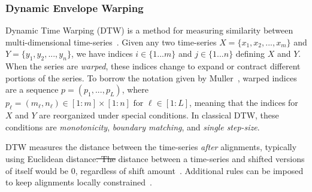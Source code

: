 \documentclass[lettersize,journal]{IEEEtran}
\makeatletter
\providecommand{\DIFadd}[1]{{\protect\color{blue}\uwave{#1}}} %
\providecommand{\DIFdel}[1]{{\protect\color{red}\sout{#1}}} %
\providecommand{\DIFaddbegin}{} %
\providecommand{\DIFaddend}{} %
\providecommand{\DIFdelbegin}{} %
\providecommand{\DIFdelend}{} %
\providecommand{\DIFscaledelfig}{0.5}
\newlength{\DIFdelgraphicswidth} %
\newlength{\DIFdelgraphicsheight} %
\providecommand{\DIFaddincludegraphics}[2][]{{\color{blue}\fbox{\DIFOincludegraphics[#1]{#2}}}} %
\providecommand{\DIFdelincludegraphics}[2][]{%
\sbox{\DIFdelgraphicsbox}{\DIFOincludegraphics[#1]{#2}}%
\settoboxwidth{\DIFdelgraphicswidth}{\DIFdelgraphicsbox} %
\settoboxtotalheight{\DIFdelgraphicsheight}{\DIFdelgraphicsbox} %
\scalebox{\DIFscaledelfig}{%
\parbox[b]{\DIFdelgraphicswidth}{\usebox{\DIFdelgraphicsbox}\\[-\baselineskip] \rule{\DIFdelgraphicswidth}{0em}}\llap{\resizebox{\DIFdelgraphicswidth}{\DIFdelgraphicsheight}{%
\setlength{\unitlength}{\DIFdelgraphicswidth}%
\begin{picture}(1,1)%
\thicklines\linethickness{2pt} %
{\color[rgb]{1,0,0}\put(0,0){\framebox(1,1){}}}%
{\color[rgb]{1,0,0}\put(0,0){\line( 1,1){1}}}%
{\color[rgb]{1,0,0}\put(0,1){\line(1,-1){1}}}%
\end{picture}%
}\hspace*{3pt}}} %
} %
\DeclareRobustCommand{\DIFaddbegin}{\DIFOaddbegin \let\includegraphics\DIFaddincludegraphics} %
\DeclareRobustCommand{\DIFaddend}{\DIFOaddend \let\includegraphics\DIFOincludegraphics} %
\DeclareRobustCommand{\DIFdelbegin}{\DIFOdelbegin \let\includegraphics\DIFdelincludegraphics} %
\DeclareRobustCommand{\DIFdelend}{\DIFOaddend \let\includegraphics\DIFOincludegraphics} %
\let\sout@orig\sout %
\renewcommand{\sout}[1]{\ifmmode\text{\sout@orig{\ensuremath{#1}}}\else\sout@orig{#1}\fi} %
\makeatother
\begin{document}
\subsubsection{Dynamic Envelope Warping}
Dynamic Time Warping (DTW) is a method for measuring similarity between multi-dimensional time-series~\cite{rabiner1993fundamentals,muller2007dynamic,giorgino2009computing}. Given any two time-series $X = \{x_1,x_2,...,x_m\}$ and $Y = \{y_1,y_2,...,y_n\}$, we have indices $i\in\{1...m\}$ and $j\in\{1...n\}$ defining $X$ and $Y$. When the series are \textit{warped}, these indices change to expand or contract different portions of the series. To borrow the notation given by Muller~\cite{muller2007dynamic}, warped indices are a sequence $p=(p_1,...,p_L)$, where \(p_\ell = (m_\ell, n_\ell) \in [1 : m] \times [1 : n] \text{ for } \ell \in [1 : L]\), meaning that the indices for $X$ and $Y$ are reorganized under special conditions. In classical DTW, these conditions are \textit{monotonicity}, \textit{boundary matching}, and \textit{single step-size}. \DIFdelbegin %

\DIFdelend DTW measures the distance between the time-series \textit{after} alignments, typically using Euclidean distance\DIFdelbegin \DIFdel{. The }\DIFdelend \DIFaddbegin \DIFadd{, such that the }\DIFaddend distance between a time-series and shifted versions of itself would be 0, regardless of shift amount~\cite{tavenard.blog.dtw}. Additional rules can be imposed to keep alignments locally constrained~\cite{itakura1975minimum,sakoe1978dynamic}.
\end{document}
